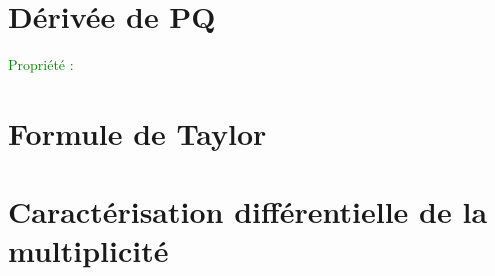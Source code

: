 \documentclass{article}
\begin{document}
\section{Dérivée de PQ}
\textcolor{green}{Propriété :}
\section{Formule de Taylor}
\section{Caractérisation différentielle de la multiplicité}
\end{document}
